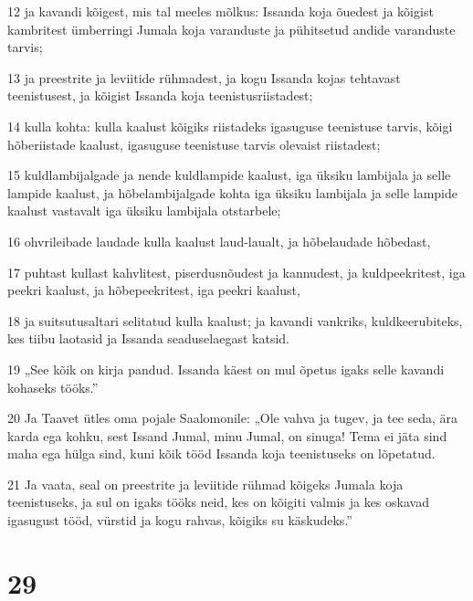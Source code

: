 \par 12 ja kavandi kõigest, mis tal meeles mõlkus: Issanda koja õuedest ja kõigist kambritest ümberringi Jumala koja varanduste ja pühitsetud andide varanduste tarvis;
\par 13 ja preestrite ja leviitide rühmadest, ja kogu Issanda kojas tehtavast teenistusest, ja kõigist Issanda koja teenistusriistadest;
\par 14 kulla kohta: kulla kaalust kõigiks riistadeks igasuguse teenistuse tarvis, kõigi hõberiistade kaalust, igasuguse teenistuse tarvis olevaist riistadest;
\par 15 kuldlambijalgade ja nende kuldlampide kaalust, iga üksiku lambijala ja selle lampide kaalust, ja hõbelambijalgade kohta iga üksiku lambijala ja selle lampide kaalust vastavalt iga üksiku lambijala otstarbele;
\par 16 ohvrileibade laudade kulla kaalust laud-laualt, ja hõbelaudade hõbedast,
\par 17 puhtast kullast kahvlitest, piserdusnõudest ja kannudest, ja kuldpeekritest, iga peekri kaalust, ja hõbepeekritest, iga peekri kaalust,
\par 18 ja suitsutusaltari selitatud kulla kaalust; ja kavandi vankriks, kuldkeerubiteks, kes tiibu laotasid ja Issanda seaduselaegast katsid.
\par 19 „See kõik on kirja pandud. Issanda käest on mul õpetus igaks selle kavandi kohaseks tööks.”
\par 20 Ja Taavet ütles oma pojale Saalomonile: „Ole vahva ja tugev, ja tee seda, ära karda ega kohku, sest Issand Jumal, minu Jumal, on sinuga! Tema ei jäta sind maha ega hülga sind, kuni kõik tööd Issanda koja teenistuseks on lõpetatud.
\par 21 Ja vaata, seal on preestrite ja leviitide rühmad kõigeks Jumala koja teenistuseks, ja sul on igaks tööks neid, kes on kõigiti valmis ja kes oskavad igasugust tööd, vürstid ja kogu rahvas, kõigiks su käskudeks.”

\chapter{29}


